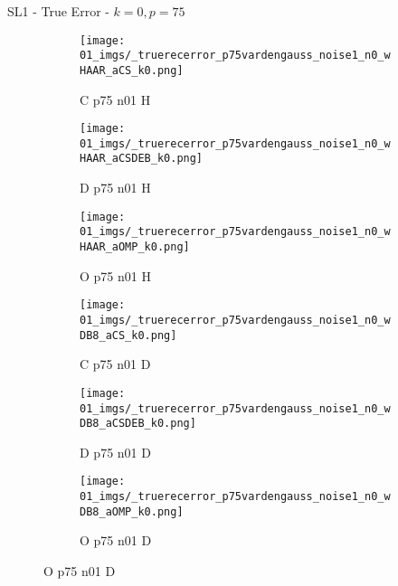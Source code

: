 \begin{frame}{SL1 - True Error - $k=0,p=75$}{}
\begin{figure}
\begin{subfigure}{0.13\textwidth}
\texttt{[image: 01\_imgs/\_truerecerror\_p75vardengauss\_noise1\_n0\_wHAAR\_aCS\_k0.png]}
\caption*{\tiny C p75 n01 H}
\end{subfigure}
\begin{subfigure}{0.13\textwidth}
\texttt{[image: 01\_imgs/\_truerecerror\_p75vardengauss\_noise1\_n0\_wHAAR\_aCSDEB\_k0.png]}
\caption*{\tiny D p75 n01 H}
\end{subfigure}
\begin{subfigure}{0.13\textwidth}
\texttt{[image: 01\_imgs/\_truerecerror\_p75vardengauss\_noise1\_n0\_wHAAR\_aOMP\_k0.png]}
\caption*{\tiny O p75 n01 H}
\end{subfigure}
\begin{subfigure}{0.13\textwidth}
\texttt{[image: 01\_imgs/\_truerecerror\_p75vardengauss\_noise1\_n0\_wDB8\_aCS\_k0.png]}
\caption*{\tiny C p75 n01 D}
\end{subfigure}
\begin{subfigure}{0.13\textwidth}
\texttt{[image: 01\_imgs/\_truerecerror\_p75vardengauss\_noise1\_n0\_wDB8\_aCSDEB\_k0.png]}
\caption*{\tiny D p75 n01 D}
\end{subfigure}
\begin{subfigure}{0.13\textwidth}
\texttt{[image: 01\_imgs/\_truerecerror\_p75vardengauss\_noise1\_n0\_wDB8\_aOMP\_k0.png]}
\caption*{\tiny O p75 n01 D}
\end{subfigure}

\vspace{5pt}


\end{figure}
\end{frame}
